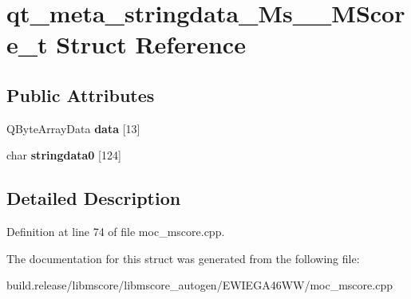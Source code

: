 \hypertarget{structqt__meta__stringdata___ms_____m_score__t}{}\section{qt\+\_\+meta\+\_\+stringdata\+\_\+\+Ms\+\_\+\+\_\+\+M\+Score\+\_\+t Struct Reference}
\label{structqt__meta__stringdata___ms_____m_score__t}
\subsection*{Public Attributes}
\begin{DoxyCompactItemize}
\item 
\mbox{\label{structqt__meta__stringdata___ms_____m_score__t_ac31fa1c48f4cfefa9c9920608cb18ee7}} 
Q\+Byte\+Array\+Data {\bfseries data} \mbox{[}13\mbox{]}
\item 
\mbox{\label{structqt__meta__stringdata___ms_____m_score__t_a295172a833a047562e4a09849c2f2432}} 
char {\bfseries stringdata0} \mbox{[}124\mbox{]}
\end{DoxyCompactItemize}


\subsection{Detailed Description}


Definition at line 74 of file moc\+\_\+mscore.\+cpp.



The documentation for this struct was generated from the following file\+:\begin{DoxyCompactItemize}
\item 
build.\+release/libmscore/libmscore\+\_\+autogen/\+E\+W\+I\+E\+G\+A46\+W\+W/moc\+\_\+mscore.\+cpp\end{DoxyCompactItemize}
